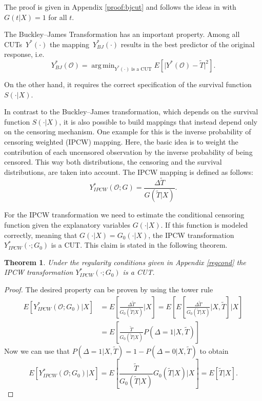 \documentclass[12pt, a4paper]{scrartcl}
\theoremstyle{definition}
\theoremstyle{plain}
\newtheorem{Theorem}{Theorem}[section]
\numberwithin{equation}{section}
\numberwithin{figure}{section}
\numberwithin{table}{section}
\DeclareMathOperator*{\argmin}{arg\,min}
\begin{document}
	The proof is given in Appendix \ref{proof:bjcut} and follows the ideas in \citet*{drcut} with $G(t\vert X)=1$ for all $t$.
	
	The Buckley--James Transformation has an important property.
	Among all CUTs~$Y^*(\cdot)$ the mapping~$Y_{BJ}^* (\cdot)$ results in the best predictor of the original response, i.e.
	\begin{equation*}
	Y_{BJ}^* (\mathcal{O})= \argmin_{\text{$Y^*(\cdot)$~is~a~CUT}} E[ \vert Y^*(\mathcal{O}) - \tilde T \vert ^2].
	\end{equation*}
	
	On the other hand, it requires the correct specification of the survival function~$S(\cdot\vert X)$.

	In contrast to the Buckley--James transformation, which depends on the survival function $S(\cdot\vert X)$, it is also possible to build mappings that instead depend only on the censoring mechanism.
	One example for this is the inverse probability of censoring weighted (IPCW) mapping.
	Here, the basic idea is to weight the contribution of each uncensored observation by the inverse probability of being censored.
	This way both distributions, the censoring and the survival distributions, are taken into account.
	The IPCW mapping is defined as follows:
	\begin{equation*}
	Y_{IPCW}^*(\mathcal{O}; G) = \frac{\Delta \tilde T}{G(\tilde T \vert X)}.
	\end{equation*}

	For the IPCW transformation we need to estimate the conditional censoring function given the explanatory variables $G(\cdot\vert X)$.
	If this function is modeled correctly, meaning that $G(\cdot\vert X)=G_0(\cdot\vert X)$, the IPCW transformation $Y_{IPCW}^*(\cdot; G_0)$ is a CUT.
	This claim is stated in the following theorem.
	\begin{Theorem}
		Under the regularity conditions given in Appendix \ref{regcond} the IPCW transformation $Y_{IPCW}^*(\cdot; G_0)$ is a CUT.
	\end{Theorem}
	\begin{proof}
		The desired property can be proven by using the tower rule
		\begin{equation*}
		\begin{split}
		E\left[Y_{IPCW}^*(\mathcal{O}; G_0)\vert X\right] &={} E\left[\frac{\Delta \tilde T}{G_0(\tilde T\vert X)}\vert X\right] = E\left[E\left[\frac{\Delta \tilde T}{G_0(\tilde T\vert X)}\vert X, \tilde T\right]\vert X\right]\\
		&={} E\left[\frac{\tilde T}{G_0(\tilde T \vert X)}P(\Delta = 1 \vert X, \tilde T)\right]
		\end{split}
		\end{equation*}
		Now we can use that $P(\Delta = 1\vert X, \tilde T) = 1-P(\Delta = 0\vert X, \tilde T)$ to obtain
		\begin{equation*}
		E\left[Y_{IPCW}^*(\mathcal{O}; G_0)\vert X\right] = E\left[\frac{\tilde T}{G_0(\tilde T \vert X)}G_0(\tilde T \vert X)\vert X\right] = E[\tilde T \vert X].
		\end{equation*}
		
	\end{proof}
		
\end{document}
